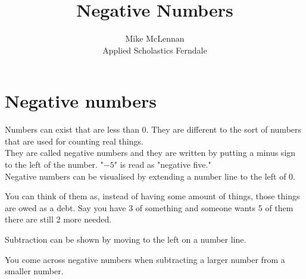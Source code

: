 \documentclass{article}
\title{Negative Numbers}
\author{Mike McLennan\\
	Applied Scholastics Ferndale\\}
\date{}
\begin{document}
\maketitle
\newpage

\large
\section*{Negative numbers}

Numbers can exist that are less than 0. They are different to the sort of numbers that are used for counting real things.\\

They are called negative numbers and they are written by putting a minus sign to the left of the number. "$-5$" is read as "negative five."\\

Negative numbers can be visualised by extending a number line to the left of 0.\\


\vspace{16pt}
You can think of them as, instead of having some amount of things, those things are owed as a debt. Say you have 3 of something  and someone wants 5 of them  there are still 2 more needed. \\

\newpage

Subtraction can be shown by moving to the left on a number line.\\


\vspace{32pt}
You come across negative numbers when subtracting a larger number from a smaller number.\\

\end{document}

